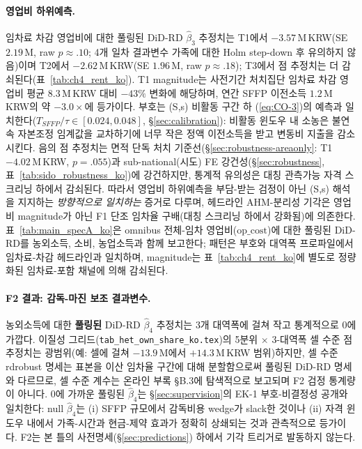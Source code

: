 \documentclass[12pt, a4paper]{article}
\begin{document}
\paragraph{영업비 하위예측.} 임차료 차감 영업비에 대한 풀링된 DiD-RD $\hat\beta_3$ 추정치는 T1에서 $-3.57$\,M\,KRW(SE $2.19$\,M, raw $p \approx .10$; 4개 일차 결과변수 가족에 대한 Holm step-down 후 유의하지 않음)이며 T2에서 $-2.62$\,M\,KRW(SE $1.96$\,M, raw $p \approx .18$); T3에서 점 추정치는 더 감쇠된다(표~\ref{tab:ch4_rent_ko}). T1 magnitude는 사전기간 처치집단 임차료 차감 영업비 평균 $8.3$\,M\,KRW 대비 $-43\%$ 변화에 해당하며, 연간 SFFP 이전소득 $1.2$\,M\,KRW의 약 $-3.0 \times$에 등가이다. 부호는 (S,s) 비활동 구간 하 (\ref{eq:CO-3})의 예측과 일치한다($T_{SFFP}/\tau \in [0.024, 0.048]$, \S\ref{sec:calibration}): 비활동 윈도우 내 소농은 불연속 자본조정 임계값을 교차하기에 너무 작은 정액 이전소득을 받고 변동비 지출을 감소시킨다. 음의 점 추정치는 면적 단독 처치 기준선(\S\ref{sec:robustness-areaonly}: T1 $-4.02$\,M\,KRW, $p = .055$)과 sub-national(시도) FE 강건성(\S\ref{sec:robustness}, 표~\ref{tab:sido_robustness_ko})에 강건하지만, 통계적 유의성은 대칭 관측가능 자격 스크리닝 하에서 감쇠된다. 따라서 영업비 하위예측을 부담-받는 검정이 아닌 (S,s) 해석을 지지하는 \emph{방향적으로 일치하는} 증거로 다루며, 헤드라인 AHM-분리성 기각은 영업비 magnitude가 아닌 F1 단조 임차율 구배(대칭 스크리닝 하에서 강화됨)에 의존한다. 표~\ref{tab:main_specA_ko}은 omnibus 전체-임차 영업비($\text{op\_cost}$)에 대한 풀링된 DiD-RD를 농외소득, 소비, 농업소득과 함께 보고한다; 패턴은 부호와 대역폭 프로파일에서 임차료-차감 헤드라인과 일치하며, magnitude는 표~\ref{tab:ch4_rent_ko}에 별도로 정량화된 임차료-포함 채널에 의해 감쇠된다.



\paragraph{F2 결과: 감독-마진 보조 결과변수.} 농외소득에 대한 \textbf{풀링된} DiD-RD $\hat\beta_4$ 추정치는 3개 대역폭에 걸쳐 작고 통계적으로 0에 가깝다. 이질성 그리드(\texttt{tab\_het\_own\_share\_ko.tex})의 5분위 $\times$ 3-대역폭 셀 수준 점 추정치는 광범위(예: 셀에 걸쳐 $-13.9$\,M에서 $+14.3$\,M\,KRW 범위)하지만, 셀 수준 rdrobust 명세는 표본을 이산 임차율 구간에 대해 분할함으로써 풀링된 DiD-RD 명세와 다르므로, 셀 수준 계수는 온라인 부록 \S B.3에 탐색적으로 보고되며 F2 검정 통계량이 아니다. 0에 가까운 풀링된 $\hat\beta_4$는 \S\ref{sec:supervision}의 EK-1 부호-비결정성 공개와 일치한다: null $\hat\beta_4$는 (i) SFFP 규모에서 감독비용 wedge가 slack한 것이나 (ii) 자격 윈도우 내에서 가족-시간과 현금-제약 효과가 정확히 상쇄되는 것과 관측적으로 등가이다. F2는 본 틀의 사전명세(\S\ref{sec:predictions}) 하에서 기각 트리거로 발동하지 않는다.
\end{document}
